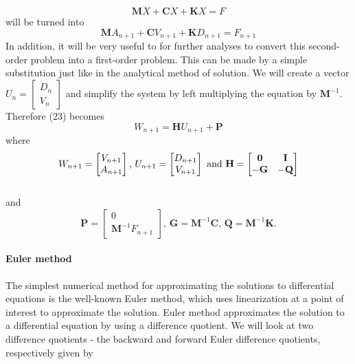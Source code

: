 \documentclass{article}
\begin{document}
				\begin{equation*}
					\textbf{M}\ddot{X}+\textbf{C}\dot{X}+\textbf{K}X = F
				\end{equation*}
will be turned into 
				\begin{equation}
					\textbf{M}A_{n+1}+\textbf{C}V_{n+1}+\textbf{K}D_{n+1} =F_{n+1}
				\end{equation}
In addition, it will be very useful to for further analyses to convert this second-order problem into a first-order problem. This can be made by a simple substitution just like in the analytical method of solution. We will create a vector $U_n = \begin{bmatrix} D_n\\V_n \end{bmatrix}$ and simplify the system by left multiplying the equation by $\textbf{M}^{-1}$. Therefore (23) becomes  
				\begin{equation}
					W_{n+1}=\textbf{H}U_{n+1} + \textbf{P}
				\end{equation}
where 
				\begin{equation*}
					W_{n+1}=\begin{bmatrix}V_{n+1}\\ A_{n+1}\end{bmatrix}\text{,     } U_{n+1}=\begin{bmatrix}D_{n+1}\\ V_{n+1}\end{bmatrix} \text{     and     } \\ \\  \textbf{H} = \begin{bmatrix} \textbf{0} & \textbf{I} \\ -\textbf{G} &-\textbf{Q} \end{bmatrix}
				\end{equation*}\\ 
				and \begin{equation*} \textbf{P} = \begin{bmatrix} 0\\ \textbf{M}^{-1} F_{n+1}\end{bmatrix}\text{,     }\textbf{G} = \textbf{M}^{-1}\textbf{C}\text{,     }\textbf{Q} = \textbf{M}^{-1} \textbf{K}\text{.}\end{equation*}


			\paragraph{Euler method}  The simplest numerical method for approximating the solutions to differential equations is the well-known Euler method, which uses linearization at a point of interest to approximate the solution. Euler method approximates the solution to a differential equation by using a difference quotient. We will look at two difference quotients - the backward and forward Euler difference quotients, respectively given by
\end{document}

